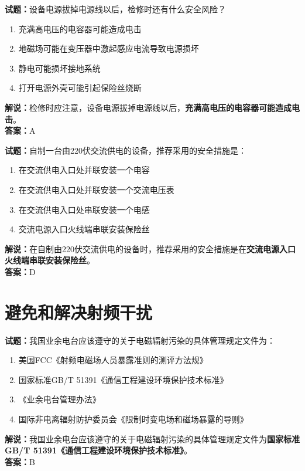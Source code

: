 \documentclass{ctexbook}
\begin{document}
\noindent\textbf{试题：}设备电源拔掉电源线以后，检修时还有什么安全风险？
\begin{enumerate}[leftmargin=3em]
	\item 充满高电压的电容器可能造成电击
	\item 地磁场可能在变压器中激起感应电流导致电源损坏
	\item 静电可能损坏接地系统
	\item 打开电源外壳可能引起保险丝烧断
\end{enumerate}
\noindent\textbf{解说：}检修时应注意，设备电源拔掉电源线以后，\textbf{充满高电压的电容器可能造成电击}。\\\noindent\textbf{答案：}A


\bigskip



\noindent\textbf{试题：}自制一台由220伏交流供电的设备，推荐采用的安全措施是：
\begin{enumerate}[leftmargin=3em]
	\item 在交流供电入口处并联安装一个电容
	\item 在交流供电入口处并联安装一个交流电压表
	\item 在交流供电入口处串联安装一个电感
	\item 交流电源入口火线端串联安装保险丝
\end{enumerate}
\noindent\textbf{解说：}在自制由220伏交流供电的设备时，推荐采用的安全措施是在\textbf{交流电源入口火线端串联安装保险丝}。\\\noindent\textbf{答案：}D





\chapter{避免和解决射频干扰}

\newpage

\noindent\textbf{试题：}我国业余电台应该遵守的关于电磁辐射污染的具体管理规定文件为：
\begin{enumerate}[leftmargin=3em]
\item 美国FCC《射频电磁场人员暴露准则的测评方法规》
\item 国家标准GB/T 51391《通信工程建设环境保护技术标准》
\item 《业余电台管理办法》
\item 国际非电离辐射防护委员会《限制时变电场和磁场暴露的导则》
\end{enumerate}
\noindent\textbf{解说：}我国业余电台应该遵守的关于电磁辐射污染的具体管理规定文件为\textbf{国家标准GB/T 51391《通信工程建设环境保护技术标准》}。\\\textbf{答案：}B
\end{document}
